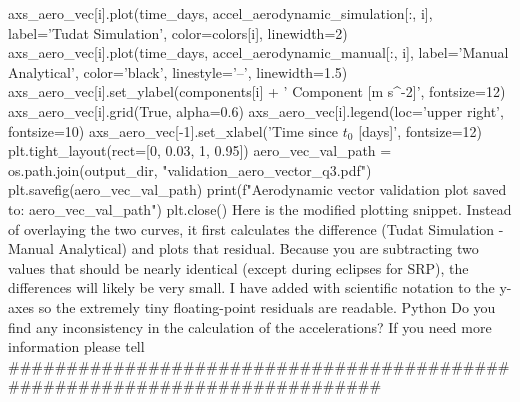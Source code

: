 {}axs_aero_vec[i].plot(time_days, accel_aerodynamic_simulation[:, i], label='Tudat Simulation', color=colors[i], linewidth=2)\markdownRendererInterblockSeparator
{}
\markdownRendererSectionEnd \markdownRendererSectionBegin
{}\markdownRendererInterblockSeparator
{}axs_aero_vec[i].plot(time_days, accel_aerodynamic_manual[:, i], label='Manual Analytical', color='black', linestyle='--', linewidth=1.5) axs_aero_vec[i].set_ylabel(components[i] + ' Component [m s^-2]', fontsize=12) axs_aero_vec[i].grid(True, alpha=0.6) axs_aero_vec[i].legend(loc='upper right', fontsize=10) axs_aero_vec[-1].set_xlabel('Time since $t_0$ [days]', fontsize=12) plt.tight_layout(rect=[0, 0.03, 1, 0.95]) aero_vec_val_path = os.path.join(output_dir, "validation_aero_vector_q3.pdf") plt.savefig(aero_vec_val_path) print(f"Aerodynamic vector validation plot saved to: {aero_vec_val_path}") plt.close()\markdownRendererInterblockSeparator
{}\markdownRendererSectionBegin
{}\markdownRendererInterblockSeparator
{}Here is the modified plotting snippet. Instead of overlaying the two curves, it first calculates the difference (Tudat Simulation - Manual Analytical) and plots that residual.\markdownRendererInterblockSeparator
{}Because you are subtracting two values that should be nearly identical (except during eclipses for SRP), the differences will likely be very small. I have added  with scientific notation to the y-axes so the extremely tiny floating-point residuals are readable.\markdownRendererInterblockSeparator
{}Python\markdownRendererInterblockSeparator
{}\markdownRendererInterblockSeparator
{}\markdownRendererThematicBreak{}\markdownRendererInterblockSeparator
{}
\markdownRendererSectionEnd \markdownRendererSectionBegin
{}\markdownRendererInterblockSeparator
{}Do you find any inconsistency in the calculation of the accelerations? If you need more information please tell\markdownRendererInterblockSeparator
{}###########################################################################\markdownRendererInterblockSeparator
{}
\markdownRendererSectionEnd 
\markdownRendererSectionEnd \markdownRendererSectionBegin
\markdownRendererHeadingOne{}\markdownRendererInterblockSeparator
{}
\markdownRendererSectionEnd \markdownRendererSectionBegin
{}\markdownRendererInterblockSeparator
